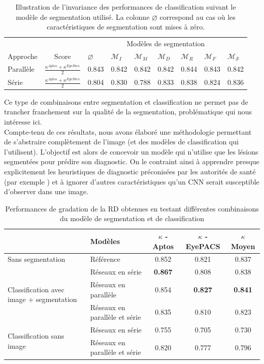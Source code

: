 \begin{table}
	\centering
	\caption{Illustration de l'invariance des performances de classification suivant le modèle de segmentation utilisé. La colonne $\varnothing$ correspond au cas où les caractéristiques de segmentation sont mises à zéro. }
	\label{tab:invarianceResults}
	\begin{tabular}{lclllllll}
		\toprule
		&& \multicolumn{7}{c}{Modèles de segmentation} \\
		Approche & Score & $\varnothing$ & $\mathcal{M}_I$ & $\mathcal{M}_M$ & $\mathcal{M}_D$& $\mathcal{M}_R$ & $\mathcal{M}_F$ & $\mathcal{M}_\mathcal{S}$ \\
		\midrule
		Parallèle & $\frac{\kappa^{Aptos} + \kappa^{EyePacs}}{2}$& 0.843 & 0.842
		& 0.842 & 0.842 & 0.844 & 0.843 & 0.842 \\
		\midrule
		Série & $\frac{\kappa^{Aptos} + \kappa^{EyePacs}}{2}$ & 0.804 & 0.830 & 0.788
		 & 0.833 & 0.838 & 0.824& 0.836 
		\\
		\bottomrule
	\end{tabular}
\end{table}

Ce type de combinaisons entre segmentation et classification ne permet pas de trancher franchement sur la qualité de la segmentation, problématique qui nous intéresse ici. \\
Compte-tenu de ces résultats, nous avons élaboré une méthodologie permettant de s'abstraire complètement de l'image (et des modèles de classification qui l'utilisent). L'objectif est alors de concevoir un modèle qui n'utilise que les lésions segmentées pour prédire son diagnostic.
On le contraint ainsi à apprendre presque explicitement les heuristiques de diagnostic préconisées par les autorités de santé (par exemple \cite{boucherEvidencebasedCanadianGuidelines2020a}) et à ignorer d'autres caractéristiques qu'un CNN serait susceptible d'observer dans une image.
\begin{table}
	\centering
	\caption{Performances de gradation de la RD obtenues en testant différentes combinaisons du modèle de segmentation et de classification}
	\label{tab:PerfModelClassifSegmen}
	\begin{tabular}{llccc}
		\toprule
		&Modèles & $\kappa$ - Aptos & $\kappa$ - EyePACS & $\kappa$ Moyen\\
		\midrule
		Sans segmentation & Référence & 0.852 & 0.821 & 0.837 \\
		\midrule
		\multirow{3}{8em}{Classification avec image + segmentation} &
		Réseaux en série & \textbf{0.867} & 0.808 & 0.838 \\		
		& Réseaux en parallèle & 0.854 & \textbf{0.827} & \textbf{0.841} \\		
		& Réseaux en parallèle et série & 0.835 & 0.810 & 0.823 \\
		\midrule
		\multirow{2}{8em}{Classification sans image} &
		Réseaux en série & 0.755 & 0.705 & 0.730 \\		
		& Réseaux en parallèle et série & 0.820 & 0.777 & 0.796 \\
		\bottomrule
		
	\end{tabular}
\end{table}


